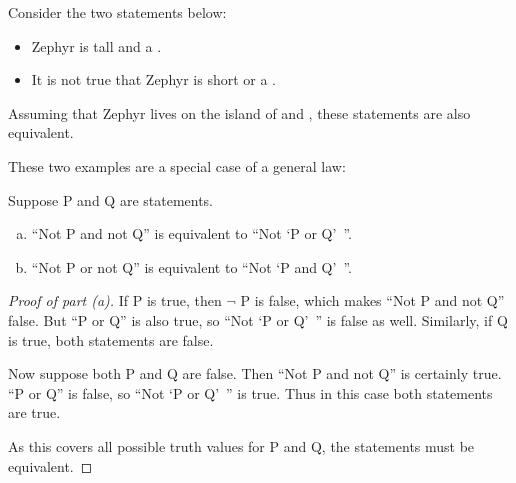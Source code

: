 \documentclass{tufte-book}
\begin{document}
\begin{example}
  Consider the two statements below:
  \begin{itemize}
      \item Zephyr is tall and a \knave.
      \item It is not true that Zephyr is short or a \knight.
  \end{itemize}
  Assuming that Zephyr lives on the island of \knights and \knaves, these statements are also equivalent.
\end{example}

These two examples are a special case of a general law:
\begin{theorem} 
  Suppose P and Q are statements.
  \begin{enumerate}[(a)]
      \item ``Not P and not Q'' is equivalent to ``Not `P or Q'~''.
      \item ``Not P or not Q'' is equivalent to ``Not `P and Q'~''.
  \end{enumerate}
\end{theorem}

\begin{proof}[Proof of part (a)]
  If P is true, then $\neg$ P is false, which makes ``Not P and not Q'' false. But ``P or Q'' is also true, so ``Not `P or Q'~'' is false as well. Similarly, if Q is true, both statements are false.

  Now suppose both P and Q are false. Then ``Not P and not Q'' is certainly true. ``P or Q'' is false, so ``Not `P or Q'~'' is true. Thus in this case both statements are true.

  As this covers all possible truth values for P and Q, the statements must be equivalent.
\end{proof}
\end{document}
